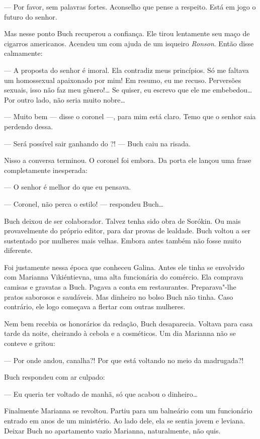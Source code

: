 --- Por favor, sem palavras fortes. Aconselho que pense a respeito. Está
em jogo o futuro do senhor.

Mas nesse ponto Buch recuperou a confiança. Ele tirou lentamente seu
maço de cigarros americanos. Acendeu um com ajuda de um isqueiro
\emph{Ronson}. Então disse calmamente:

--- A proposta do senhor é imoral. Ela contradiz meus princípios. Só me
faltava um homossexual apaixonado por mim! Em resumo, eu me recuso.
Perversões sexuais, isso não faz meu gênero!\ldots{} Se quiser, eu escrevo
que ele me embebedou\ldots{} Por outro lado, não seria muito nobre\ldots{}

--- Muito bem --- disse o coronel ---, para mim está claro. Temo que o
senhor saia perdendo dessa.

--- Será possível sair ganhando do ?! --- Buch caiu na risada.

Nisso a conversa terminou. O coronel foi embora. Da porta ele lançou uma
frase completamente inesperada:

--- O senhor é melhor do que eu pensava.

--- Coronel, não perca o estilo! --- respondeu Buch\ldots{}

Buch deixou de ser colaborador. Talvez tenha sido obra de Sorókin. Ou
mais provavelmente do próprio editor, para dar provas de lealdade. Buch
voltou a ser sustentado por mulheres mais velhas. Embora antes também
não fosse muito diferente.

Foi justamente nessa época que conheceu Galina. Antes ele tinha se
envolvido com Marianna Vikiéntievna, uma alta funcionária do comércio.
Ela comprava camisas e gravatas a Buch. Pagava a conta em restaurantes.
Preparava"-lhe pratos saborosos e saudáveis. Mas dinheiro no bolso Buch
não tinha. Caso contrário, ele logo começava a flertar com outras
mulheres.

Nem bem recebia os honorários da redação, Buch desaparecia. Voltava para
casa tarde da noite, cheirando à cebola e a cosméticos. Um dia Marianna
não se conteve e gritou:

--- Por onde andou, canalha?! Por que está voltando no meio da
madrugada?!

Buch respondeu com ar culpado:

--- Eu queria ter voltado de manhã, só que acabou o dinheiro\ldots{}

Finalmente Marianna se revoltou. Partiu para um balneário com um
funcionário entrado em anos de um ministério. Ao lado dele, ela se
sentia jovem e leviana. Deixar Buch no apartamento vazio Marianna,
naturalmente, não quis.

